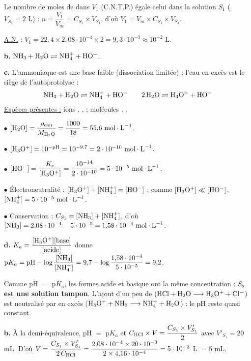\documentclass[11pt]{article}
\begin{document}

 Le nombre de moles de  dans $V_1$ (C.N.T.P.) égale celui dans la solution $S_1$ ($V_{S_1} = 2$ L) : $n = \dfrac{V_1}{V_m} = C_{S_1}\times V_{S_1}$, d'où $V_1 = V_m\times C_{S_1}\times V_{S_1}$.

\underline{A.N.} : $V_1 = 22{,}4\times 2{,}08\cdot10^{-4}\times 2 = 9{,}3\cdot10^{-3} \approx 10^{-2}$ L.

\textbf{b.} $\mathrm{NH_3 + H_2O \rightleftharpoons NH_4^+ + HO^-}$.

\textbf{c.} L'ammoniaque est une base faible (dissociation limitée) ; l'eau en excès est le siège de l'autoprotolyse :
\[ \mathrm{NH_3 + H_2O \rightleftharpoons NH_4^+ + HO^-} \qquad \mathrm{2\,H_2O \rightleftharpoons H_3O^+ + HO^-} \]
\underline{Espèces présentes :} ions , ,  ; molécules , .

$\bullet$ $[\ch{H_2O}] = \dfrac{\rho_{\text{eau}}}{M_{\ch{H_2O}}} = \dfrac{1000}{18} = 55{,}6\ \text{mol}\cdot\text{L}^{-1}$.

$\bullet$ $[\mathrm{H_3O^+}] = 10^{-\text{pH}} = 10^{-9{,}7} = 2\cdot10^{-10}\ \text{mol}\cdot\text{L}^{-1}$.

$\bullet$ $[\ch{HO^-}] = \dfrac{K_e}{[\ch{H_3O^+}]} = \dfrac{10^{-14}}{2\cdot10^{-10}} = 5\cdot10^{-5}\ \text{mol}\cdot\text{L}^{-1}$.

$\bullet$ Électroneutralité : $[\mathrm{H_3O^+}] + [\mathrm{NH_4^+}] = [\mathrm{HO^-}]$ ; comme $[\mathrm{H_3O^+}] \ll [\mathrm{HO^-}]$, $[\ch{NH_4^+}] = 5\cdot10^{-5}\ \text{mol}\cdot\text{L}^{-1}$.

$\bullet$ Conservation : $C_{S_1} = [\mathrm{NH_3}] + [\mathrm{NH_4^+}]$, d'où $[\ch{NH_3}] = 2{,}08\cdot10^{-4} - 5\cdot10^{-5} = 1{,}58\cdot10^{-4}\ \text{mol}\cdot\text{L}^{-1}$.

\textbf{d.} $K_a = \dfrac{[\mathrm{H_3O^+}][\text{base}]}{[\text{acide}]}$ donne $\text{p}K_a = \text{pH} - \log\dfrac{[\mathrm{NH_3}]}{[\mathrm{NH_4^+}]} = 9{,}7 - \log\dfrac{1{,}58\cdot10^{-4}}{5\cdot10^{-5}} = 9{,}2$.

 Comme pH $=$ p$K_a$, les formes acide et basique ont la même concentration : $S_2$ \textbf{est une solution tampon}. L'ajout d'un peu de  ($\mathrm{HCl + H_2O \longrightarrow H_3O^+ + Cl^-}$) est neutralisé par  en excès ($\mathrm{H_3O^+ + NH_3 \longrightarrow NH_4^+ + H_2O}$) : le pH reste quasi constant.

\textbf{b.} À la demi-équivalence, pH $=$ p$K_a$ et $C_{\mathrm{HCl}}\times V = \dfrac{C_{S_1}\times V'_{S_1}}{2}$ avec $V'_{S_1} = 20$ mL. D'où $V = \dfrac{C_{S_1}\times V'_{S_1}}{2\,C_{\mathrm{HCl}}} = \dfrac{2{,}08\cdot10^{-4}\times 20\cdot10^{-3}}{2\times 4{,}16\cdot10^{-4}} = 5\cdot10^{-3}$ L $= 5$ mL.
\end{document}
